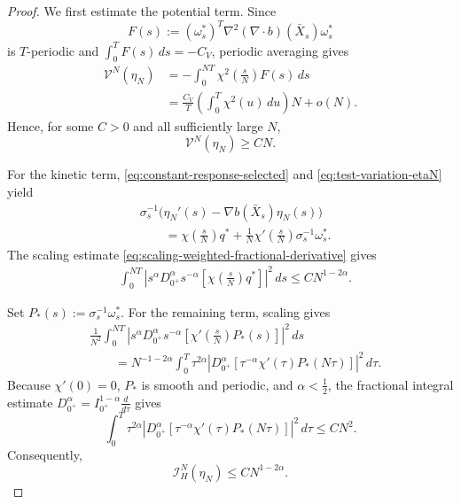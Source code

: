 \documentclass[preprint,12pt]{elsarticle}
\theoremstyle{definition}
\theoremstyle{plain}
\begin{document}
\begin{proof}
We first estimate the potential term. Since
\begin{equation*}
    F(s)
    :=
    (\omega_s^*)^T
    \nabla^2(\nabla\!\cdot b)(\bar X_s)
    \omega_s^*
\end{equation*}
is $T$-periodic and
$\int_0^T F(s)\,ds=-C_V$, periodic averaging gives
\begin{align*}
    \mathcal V^N(\eta_N)
    &=
    -
    \int_0^{NT}
    \chi^2\left(\frac{s}{N}\right)F(s)\,ds
    \\
    &=
    \frac{C_V}{T}
    \left(
        \int_0^T\chi^2(u)\,du
    \right)N
    +
    o(N).
\end{align*}
Hence, for some $C>0$ and all sufficiently large $N$,
\begin{equation}
\label{eq:potential-linear-positive}
    \mathcal V^N(\eta_N)\geq CN.
\end{equation}

For the kinetic term, \eqref{eq:constant-response-selected} and
\eqref{eq:test-variation-etaN} yield
\begin{equation*}
\begin{aligned}
&\sigma_s^{-1}
\bigl(
    \eta_N'(s)-\nabla b(\bar X_s)\eta_N(s)
\bigr)
\\
&\qquad=
\chi\left(\frac{s}{N}\right)q^*
+
\frac1N
\chi'\left(\frac{s}{N}\right)
\sigma_s^{-1}\omega_s^*.
\end{aligned}
\end{equation*}
The scaling estimate
\eqref{eq:scaling-weighted-fractional-derivative} gives
\begin{equation*}
\begin{aligned}
&\int_0^{NT}
\left|
s^\alpha D_{0^+}^{\alpha}s^{-\alpha}
\left[
    \chi\left(\frac{s}{N}\right)q^*
\right]
\right|^2\,ds
\leq
CN^{1-2\alpha}.
\end{aligned}
\end{equation*}

Set $P_*(s):=\sigma_s^{-1}\omega_s^*$. For the remaining term, scaling
gives
\begin{align*}
&\frac1{N^2}
\int_0^{NT}
\left|
s^\alpha D_{0^+}^{\alpha}s^{-\alpha}
\left[
    \chi'\left(\frac{s}{N}\right)P_*(s)
\right]
\right|^2\,ds
\\
&\qquad=
N^{-1-2\alpha}
\int_0^T
\tau^{2\alpha}
\left|
D_{0^+}^{\alpha}
\left[
    \tau^{-\alpha}\chi'(\tau)P_*(N\tau)
\right]
\right|^2\,d\tau.
\end{align*}
Because $\chi'(0)=0$, $P_*$ is smooth and periodic, and
$\alpha<\frac12$, the fractional integral estimate
$D_{0^+}^{\alpha}=I_{0^+}^{1-\alpha}\frac{d}{d\tau}$ gives
\begin{equation*}
    \int_0^T
    \tau^{2\alpha}
    \left|
    D_{0^+}^{\alpha}
    \left[
        \tau^{-\alpha}\chi'(\tau)P_*(N\tau)
    \right]
    \right|^2\,d\tau
    \leq
    CN^2.
\end{equation*}
Consequently,
\begin{equation}
\label{eq:kinetic-upper-H-greater-half}
    \mathcal I_H^N(\eta_N)
    \leq
    CN^{1-2\alpha}.
\end{equation}


\end{proof}
\end{document}

